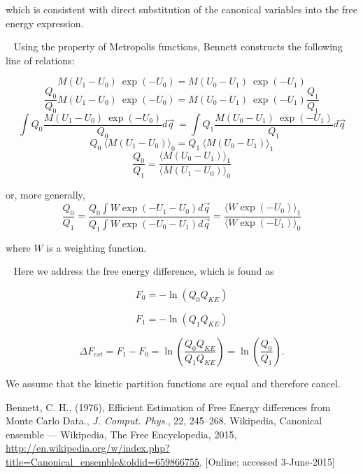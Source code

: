\documentclass[]{article}
\begin{document}
which is consistent with direct substitution of the canonical variables into the free energy expression.

~\linebreak
Using the property of Metropolis functions, Bennett constructs the following line of relations\cite{bennett}:

\[ M(U_1 - U_0)~\exp(-U_0) = M(U_0 - U_1)~\exp(-U_1) \]
\[ \frac{Q_0}{Q_0} M(U_1 - U_0)~\exp(-U_0) = M(U_0 - U_1)~\exp(-U_1) \frac{Q_1}{Q_1} \]
\[ \int Q_0  \frac{M(U_1 - U_0)~\exp(-U_0)}{Q_0} d\vec{q} ~ = \int Q_1 \frac{M(U_0 - U_1)~\exp(-U_1)}{Q_1} d\vec{q} \]
\[ Q_0~\langle M(U_1 - U_0) \rangle_0 = Q_1~\langle M(U_0 - U_1) \rangle_1 \]
\[ \frac{Q_0}{Q_1} = \frac{\langle M(U_0 - U_1) \rangle_1}{\langle M(U_1 - U_0) \rangle_0} \]

or, more generally,
\[ \frac{Q_0}{Q_1} = \frac{Q_0 \int W \exp(-U_1 - U_0) d\vec{q}}{Q_1 \int W \exp(-U_0 - U_1) d\vec{q}} = \frac{\langle W \exp(-U_0) \rangle_1}{\langle W \exp(-U_1) \rangle_0} \]

where $W$ is a weighting function.

~\linebreak
Here we address the free energy difference, which is found as

\begin{minipage}[b]{0.45\linewidth}
	\[ F_0 = - \ln(Q_0 Q_{KE} ) \]
\end{minipage}
\hfill
\begin{minipage}[b]{0.45\linewidth}
	\[ F_1 = - \ln(Q_1 Q_{KE} ) \]
\end{minipage}

\[ \Delta F_{est} = F_1 - F_0 = \ln \left( \frac{Q_0 Q_{KE}}{Q_1 Q_{KE}} \right) = \ln \left( \frac{Q_0}{Q_1} \right). \]

We assume that the kinetic partition functions are equal and therefore cancel.

\begin{thebibliography}{9}
		Bennett, C. H.,
		(1976),
		Efficient Estimation of Free Energy differences from Monte Carlo Data.,
		\emph{J. Comput. Phys.},
		22, 
		245–268.
		Wikipedia,
		Canonical ensemble --- Wikipedia{,} The Free Encyclopedia,
		2015,
		\url{http://en.wikipedia.org/w/index.php?title=Canonical_ensemble&oldid=659866755},
		[Online; accessed 3-June-2015]
\end{thebibliography}
\end{document}
